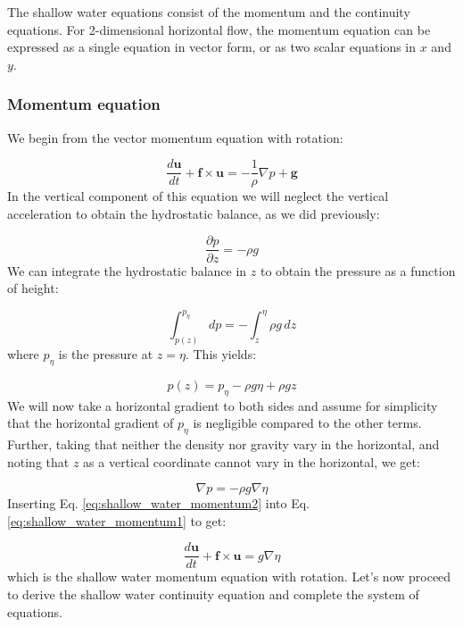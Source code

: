 \documentclass[12pt]{article}
\numberwithin{equation}{section}
\numberwithin{figure}{section}
\numberwithin{table}{section}
\begin{document}
The shallow water equations consist of the momentum and the continuity
equations.
For 2-dimensional horizontal flow, the momentum equation can be expressed as
a single equation in vector form, or as two scalar equations in $x$ and $y$.

\subsubsection{Momentum equation}

We begin from the vector momentum equation with rotation:

\begin{equation}
  \frac{d \mathbf{u}}{dt} + \mathbf{f} \times \mathbf{u} =
  - \frac{1}{\rho} \nabla p + \mathbf{g}
  \label{eq:shallow_water_momentum1}
\end{equation}
In the vertical component of this equation we will neglect the vertical
acceleration to obtain the hydrostatic balance, as we did previously:

\begin{equation}
  \frac{\partial p}{\partial z} = -\rho g
\end{equation}
We can integrate the hydrostatic balance in $z$ to obtain the pressure as a
function of height:

\begin{equation}
  \int_{p(z)}^{p_\eta} dp = - \int_z^\eta \rho g \, dz
\end{equation}
where $p_\eta$ is the pressure at $z = \eta$.
This yields:

\begin{equation}
  p(z) = p_\eta - \rho g \eta + \rho g z
\end{equation}
We will now take a horizontal gradient to both sides and assume for simplicity
that the horizontal gradient of $p_\eta$ is negligible compared to the other
terms.
Further, taking that neither the density nor gravity vary in the horizontal,
and noting that $z$ as a vertical coordinate cannot vary in the horizontal,
we get:

\begin{equation}
  \nabla p = - \rho g \nabla \eta
  \label{eq:shallow_water_momentum2}
\end{equation}
Inserting Eq. \ref{eq:shallow_water_momentum2} into
Eq. \ref{eq:shallow_water_momentum1} to get:

\begin{equation}
  \frac{d \mathbf{u}}{dt} + \mathbf{f} \times \mathbf{u} =
  g \nabla \eta
  \label{eq:shallow_water_momentum3}
\end{equation}
which is the shallow water momentum equation with rotation.
Let's now proceed to derive the shallow water continuity equation and complete
the system of equations.
\end{document}
